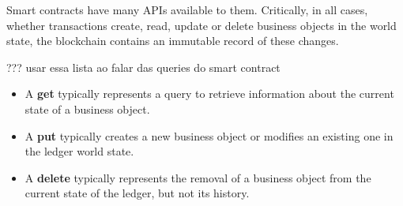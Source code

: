 Smart contracts have many APIs available to them. Critically, in all cases, whether transactions create, read, update or delete business objects in the world state, the blockchain contains an immutable record of these changes.

{\color{red} ??? usar essa lista ao falar das queries do smart contract}
\begin{itemize}
\item A \textbf{get} typically represents a query to retrieve information about the current state of a business object.
\item A \textbf{put} typically creates a new business object or modifies an existing one in the ledger world state.
\item A \textbf{delete} typically represents the removal of a business object from the current state of the ledger, but not its history.
\end{itemize}
